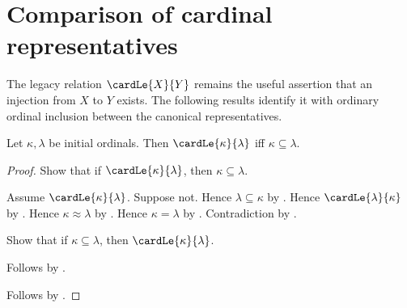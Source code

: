 


\section{Comparison of cardinal representatives}

The legacy relation $\cardLe{X}{Y}$ remains the useful assertion that an
injection from $X$ to $Y$ exists.  The following results identify it with
ordinary ordinal inclusion between the canonical representatives.

\begin{theorem}\label{initial_ordinal_cardinal_le_iff_subseteq}
    Let $\kappa,\lambda$ be initial ordinals.
    Then $\cardLe{\kappa}{\lambda}$ iff $\kappa\subseteq\lambda$.
\end{theorem}
\begin{proof}
    Show that if $\cardLe{\kappa}{\lambda}$, then
        $\kappa\subseteq\lambda$.
    \begin{subproof}
        Assume $\cardLe{\kappa}{\lambda}$.
        Suppose not.
        Hence $\lambda\subseteq\kappa$
            by .
        Hence $\cardLe{\lambda}{\kappa}$
            by .
        Hence $\kappa\approx\lambda$
            by .
        Hence $\kappa=\lambda$
            by .
        Contradiction by .
    \end{subproof}
    Show that if $\kappa\subseteq\lambda$, then
        $\cardLe{\kappa}{\lambda}$.
    \begin{subproof}
        Follows by .
    \end{subproof}
    Follows by \auto.
\end{proof}

